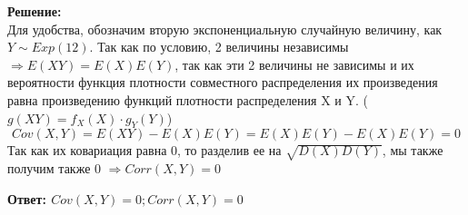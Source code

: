 \documentclass[a4paper,12pt]{article}
\begin{document}
\begin{enumerate}
\textbf{Решение:}\\
Для удобства, обозначим вторую экспоненциальную случайную величину, как $Y \sim Exp(12)$.
Так как по условию, 2 величины независимы $\Rightarrow E(XY) = E(X)E(Y)$, так как эти 2 величины не зависимы и их вероятности функция плотности совместного распределения их произведения равна произведению функций плотности распределения X и Y. ($g(XY)=f_X(X)\cdot g_Y(Y)$)
$$Cov(X,Y)=E(XY)-E(X)E(Y)=E(X)E(Y)-E(X)E(Y)=0$$
Так как их ковариация равна 0, то разделив ее на $\sqrt{D(X)D(Y)}$, мы также получим также 0 $\Rightarrow Corr(X,Y)=0$

\textbf{Ответ: $Cov(X,Y)=0; Corr(X,Y)=0$} 

\end{enumerate}
\end{document}
